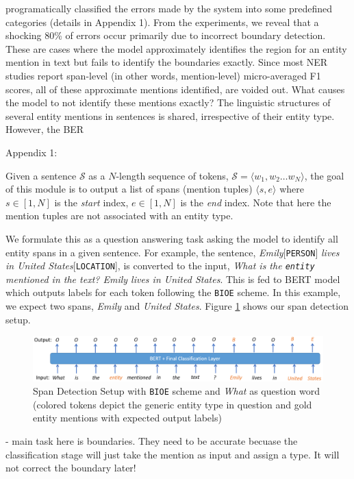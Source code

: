 programatically classified the errors made by the system into some predefined categories (details in Appendix 1). From the experiments, we reveal that a shocking 80\% of errors occur primarily due to incorrect boundary detection. These are cases where the model approximately identifies the region for an entity mention in text but fails to identify the boundaries exactly. Since most NER studies report span-level (in other words, mention-level) micro-averaged F1 scores, all of these approximate mentions identified, are voided out. What causes the model to not identify these mentions exactly? The linguistic structures of several entity mentions in sentences is shared, irrespective of their entity type. However, the BER

Appendix 1:


Given a sentence $\mathcal{S}$ as a $N$-length sequence of tokens, $\mathcal{S} = \langle w_1, w_2 \ldots w_N \rangle$, the goal of this module is to output a list of spans (mention tuples) $\langle s, e\rangle$ where $s \in [1, N]$ is the \textit{start} index, $e \in [1, N]$ is the \textit{end} index. Note that here the mention tuples are not associated with an entity type. 

We formulate this as a question answering task asking the model to identify all entity spans in a given sentence. For example, the sentence, \textit{Emily}[\texttt{PERSON}] \textit{lives in United States}[\texttt{LOCATION}], is converted to the input, \textit{What is the \texttt{entity} mentioned in the text? Emily lives in United States}. This is fed to BERT model which outputs labels for each token following the \texttt{BIOE} scheme. In this example, we expect two spans, \textit{Emily} and \textit{United States}. Figure \ref{fig:span_detection} shows our span detection setup.

\begin{figure}
    \centering
    \includegraphics[width=\linewidth]{resources/span_detection}
    \caption{Span Detection Setup with \texttt{BIOE} scheme and \textit{What} as question word (colored tokens depict the generic entity type in question and gold entity mentions with expected output labels)}
    \label{fig:span_detection}
\end{figure}

- main task here is boundaries. They need to be accurate becuase the classification stage will just take the mention as input and assign a type. It will not correct the boundary later!

